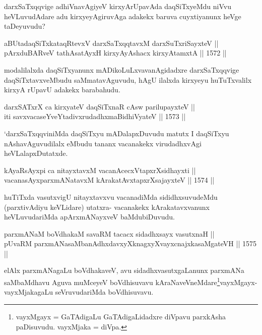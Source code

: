 \begin{artha}
darxSaTxqqvige adhiVnavAgiyeV kirxyArUpavAda daqSiTxyeMdu niVvu heVLuvudAdare adu kirxyeyAgiruvAga adakekx baruva cuyxtiyanunx heVge taDeyuvudu?
\end{artha}

\begin{shl}
aBUtadaqSiTxkataqRtevxV darxSaTxqqtavxM darxSuTxriSayxteV ||  \\
pArxduBARveV tathA\s satAyxH kirxyAyAshacx kirxyAtamxtA \hfill || 1572 ||  
\end{shl}

\begin{artha}
modalilalxda daqSiTxyanunx mADikoLuLxvavanAgidadxre darxSaTxqqvige daqSiTxtavxveMbudu saMmatavAguvudu, hAgU ilalxda kirxyeyu huTuTxvalilx kirxyA rUpavU adakekx barabahudu.
\end{artha}


\begin{shl}
darxSATxrX ca kirxyateV daqSiTxnaR cAsw parilupayxteV || \\
iti savxvacaseYveYtadivxrudadhxmaBidhiVyateV \hfill || 1573 ||  
\end{shl}

\begin{artha}
`darxSaTxqqviniMda daqSiTxyu mADalapxDuvudu matutx I daqSiTxyu nAshavAguvudilalx eMbudu tananx vacanakekx virudadhxvAgi heVLalapxDutatxde.
\end{artha}


\begin{shl}
kAyaRsAyxpi ca nitayxtavxM vacanAcecxVtapxrXsidhayxti ||  \\
vacanasAyxparxmANatavxM kArakatAvxtapxrXsajayxteV \hfill || 1574 ||  
\end{shl}

\begin{artha}
huTiTxda vasutxvigU nitayxtavxvu vacanadiMda sididhxsuvudeMdu (parxtivAdiyu keVLidare) utatxra- vacanakekx kArakatavxvanunx heVLuvudariMda apArxmANayxveV baMdubiDuvudu.
\end{artha}

\begin{shl}
parxmANaM boVdhakaM savaRM tacacx sidadhxsayx vasutxnaH || \\
pUvaRM parxmANasaMbanAdhxdavxyXknagxyXvayxcnajxkasaMgateVH \hfill || 1575 ||  
\end{shl}

\begin{artha}
elAlx parxmANagaLu boVdhakaveV, avu sidadhxvasutxgaLanunx parxmANa saMbaMdhavu Aguva muMceyeV boVdhisuvavu kAraNaveVneMdare\footnote{vayxMgayx = GaTAdigaLu GaTAdigaLidadxre diVpavu parxkAsha paDisuvudu. vayxMjaka = diVpa.}vayxMgayx-vayxMjakagaLu seVruvudariMda boVdhisuvavu.
\end{artha} 
